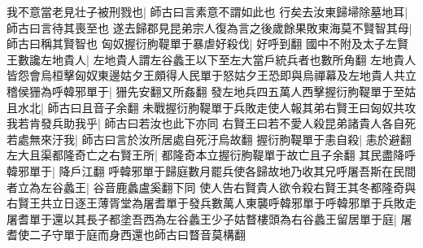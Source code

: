 我不意當老見壮子被刑戮也|{
	師古曰言素意不謂如此也}
行矣去汝東歸埽除墓地耳|{
	師古曰言待其喪至也}
遂去歸郡見昆弟宗人復為言之後歲餘果敗東海莫不賢智其母|{
	師古曰稱其賢智也}
匈奴握衍朐鞮單于暴虐好殺伐|{
	好呼到翻}
國中不附及太子左賢王數讒左地貴人|{
	左地貴人謂左谷蠡王以下至左大當戶統兵者也數所角翻}
左地貴人皆怨會烏桓擊匈奴東邊姑夕王頗得人民單于怒姑夕王恐即與烏禪幕及左地貴人共立稽侯㹪為呼韓邪單于|{
	㹪先安翻又所姦翻}
發左地兵四五萬人西擊握衍朐鞮單于至姑且水北|{
	師古曰且音子余翻}
未戰握衍朐鞮單于兵敗走使人報其弟右賢王曰匈奴共攻我若肯發兵助我乎|{
	師古曰若汝也此下亦同}
右賢王曰若不愛人殺昆弟諸貴人各自死若處無來汙我|{
	師古曰言於汝所居處自死汙烏故翻}
握衍朐鞮單于恚自殺|{
	恚於避翻}
左大且渠都隆奇亡之右賢王所|{
	都隆奇本立握衍朐鞮單于故亡且子余翻}
其民盡降呼韓邪單于|{
	降戶江翻}
呼韓邪單于歸庭數月罷兵使各歸故地乃收其兄呼屠吾斯在民間者立為左谷蠡王|{
	谷音鹿蠡盧奚翻下同}
使人告右賢貴人欲令殺右賢王其冬都隆奇與右賢王共立日逐王薄胥堂為屠耆單于發兵數萬人東襲呼韓邪單于呼韓邪單于兵敗走屠耆單于還以其長子都塗吾西為左谷蠡王少子姑瞀樓頭為右谷蠡王留居單于庭|{
	屠耆使二子守單于庭而身西還也師古曰瞀音莫構翻}


